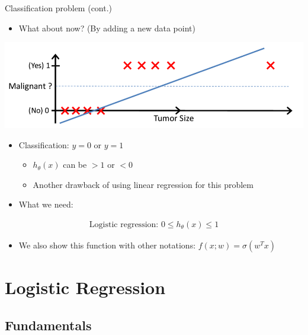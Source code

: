 \documentclass[serif, aspectratio=169]{beamer}
\begin{document}
\begin{frame}{Classification problem (cont.)}
    \begin{itemize}
        \item What about now? (By adding a new data point)
    \end{itemize}
    
    \centering
    \includegraphics[width=0.68\linewidth]{pic/lrClassification2.png}
    
    \begin{itemize}
        \item Classification: $y=0$ or $y=1$
            \begin{itemize}
                \item $h_ \theta(x)$ can be $>1$ or $<0$
                \item Another drawback of using linear regression for this problem
            \end{itemize}
        \item What we need:
    \end{itemize}
    \begin{align*}
        \text{Logistic regression:  } 0 \leq h_\theta (x) \leq 1
    \end{align*}
    \begin{itemize}
        \item We also show this function with other notations: $f(x;w)= \sigma (w^Tx)$
    \end{itemize}
\end{frame}



\section{Logistic Regression}

\subsection{Fundamentals}
\end{document}
